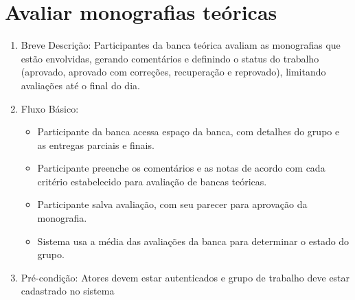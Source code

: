 \section{Avaliar monografias teóricas}
\begin{enumerate}
    \item Breve Descrição: Participantes da banca teórica avaliam as monografias que estão envolvidas, gerando comentários e definindo o status do trabalho (aprovado, aprovado com correções, recuperação e reprovado), limitando avaliações até o final do dia.
    \item Fluxo Básico:
    \begin{itemize}
        \item Participante da banca acessa espaço da banca, com detalhes do grupo e as entregas parciais e finais.
        \item Participante preenche os comentários e as notas de acordo com cada critério estabelecido para avaliação de bancas teóricas.
        \item Participante salva avaliação, com seu parecer para aprovação da monografia.
        \item Sistema usa a média das avaliações da banca para determinar o estado do grupo.
    \end{itemize}
    \item Pré-condição: Atores devem estar autenticados e grupo de trabalho deve estar cadastrado no sistema
\end{enumerate}


